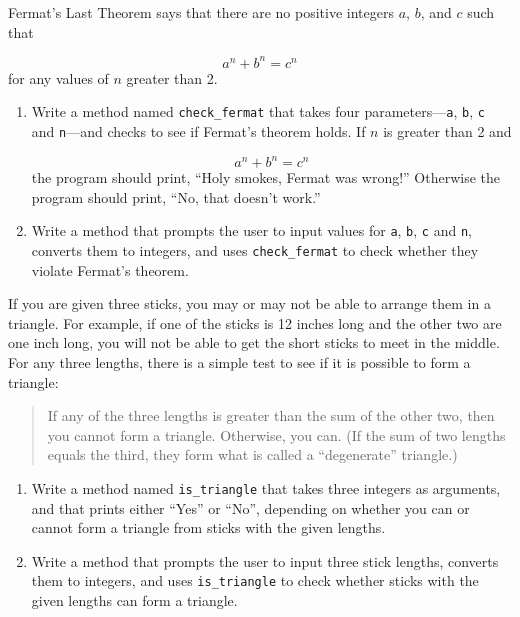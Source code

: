 \documentclass[10pt]{book}
\begin{document}
\begin{exercise}

Fermat's Last Theorem says that there are no positive integers
$a$, $b$, and $c$ such that

\[ a^n + b^n = c^n \]
%
for any values of $n$ greater than 2.

\begin{enumerate}

\item Write a method named \verb"check_fermat" that takes four
parameters---{\tt a}, {\tt b}, {\tt c} and {\tt n}---and
checks to see if Fermat's theorem holds.  If
$n$ is greater than 2 and 

\[a^n + b^n = c^n \]
%
the program should print, ``Holy smokes, Fermat was wrong!''
Otherwise the program should print, ``No, that doesn't work.''

\item Write a method that prompts the user to input values
for {\tt a}, {\tt b}, {\tt c} and {\tt n}, converts them to
integers, and uses \verb"check_fermat" to check whether they
violate Fermat's theorem.

\end{enumerate}

\end{exercise}


\begin{exercise}

If you are given three sticks, you may or may not be able to arrange
them in a triangle.  For example, if one of the sticks is 12 inches
long and the other two are one inch long, you will
not be able to get the short sticks to meet in the middle.  For any
three lengths, there is a simple test to see if it is possible to form
a triangle:

\begin{quotation}
If any of the three lengths is greater than the sum of the other
  two, then you cannot form a triangle.  Otherwise, you
  can.  (If the sum of two lengths equals the third, they form
    what is called a ``degenerate'' triangle.)
\end{quotation}

\begin{enumerate}

\item Write a method named \verb"is_triangle" that takes three
  integers as arguments, and that prints either ``Yes'' or ``No'', depending
  on whether you can or cannot form a triangle from sticks with the
  given lengths.

\item Write a method that prompts the user to input three stick
  lengths, converts them to integers, and uses \verb"is_triangle" to
  check whether sticks with the given lengths can form a triangle.

\end{enumerate}

\end{exercise}
\end{document}
